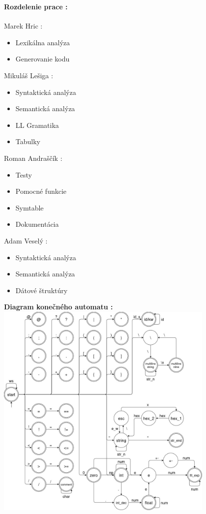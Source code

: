 \documentclass[12pt]{article}
\begin{document}
\noindent \Large \textbf{Rozdelenie prace :} \\
\noindent\makebox[\linewidth]{\rule{\textwidth}{0.4pt}}
\newline \\
\large Marek Hric : 
\normalsize
\begin{itemize}
\item Lexikálna analýza
\item Generovanie kodu
\end{itemize}
\large Mikuláš Lešiga :
\normalsize
\begin{itemize}
\item Syntaktická analýza
\item Semantická analýza
\item LL Gramatika
\item Tabulky
\end{itemize}
\large Roman Andraščík :
\normalsize
\begin{itemize}
\item Testy
\item Pomocné funkcie
\item Symtable
\item Dokumentácia
\end{itemize}
\large Adam Veselý :
\normalsize
\begin{itemize}
\item Syntaktická analýza
\item Semantická analýza
\item Dátové štruktúry
\end{itemize}
 
\newpage

\noindent \Large \textbf{Diagram konečného automatu :}
\newline \\
\includegraphics[width=0.8\textwidth,scale=0.5]{fsm}
\newline \\
\end{document}
